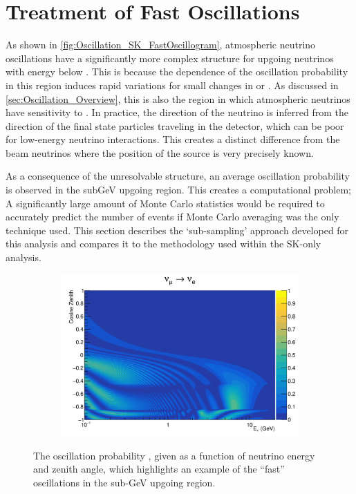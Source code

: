 \clearpage

\section{Treatment of Fast Oscillations}
\label{sec:Oscillation_FastOscillations}

As shown in \autoref{fig:Oscillation_SK_FastOscillogram}, atmospheric neutrino oscillations have a significantly more complex structure for upgoing neutrinos with energy below . This is because the  dependence of the oscillation probability in this region induces rapid variations for small changes in  or . As discussed in \autoref{sec:Oscillation_Overview}, this is also the region in which atmospheric neutrinos have sensitivity to \dcp. In practice, the direction of the neutrino is inferred from the direction of the final state particles traveling in the detector, which can be poor for low-energy neutrino interactions. This creates a distinct difference from the beam neutrinos where the position of the source is very precisely known.

As a consequence of the unresolvable structure, an average oscillation probability is observed in the subGeV upgoing region. This creates a computational problem; A significantly large amount of Monte Carlo statistics would be required to accurately predict the number of events if Monte Carlo averaging was the only technique used. This section describes the `sub-sampling' approach developed for this analysis and compares it to the methodology used within the SK-only analysis.

\begin{figure}[h]
  \begin{subfigure}[t]{0.8\textwidth}
    \includegraphics[width=\textwidth, trim={0mm 0mm 0mm 0mm}, clip,page=1]{Figures/Oscillation/FastOscillationExample.pdf}
  \end{subfigure}
  \caption{The oscillation probability , given as a function of neutrino energy and zenith angle, which highlights an example of the ``fast'' oscillations in the sub-GeV upgoing region.}
  \label{fig:Oscillation_SK_FastOscillogram}
\end{figure}

